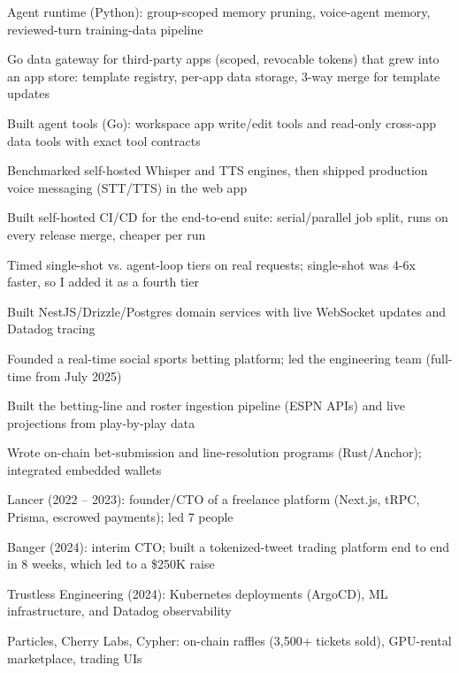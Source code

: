 \documentclass[print]{jack-resume}
\begin{document}
\begin{tightemize}
    \item Agent runtime (Python): group-scoped memory pruning, voice-agent memory, reviewed-turn training-data pipeline
    \item Go data gateway for third-party apps (scoped, revocable tokens) that grew into an app store: template registry, per-app data storage, 3-way merge for template updates
    \item Built agent tools (Go): workspace app write/edit tools and read-only cross-app data tools with exact tool contracts
    \item Benchmarked self-hosted Whisper and TTS engines, then shipped production voice messaging (STT/TTS) in the web app
    \item Built self-hosted CI/CD for the end-to-end suite: serial/parallel job split, runs on every release merge, cheaper per run
    \item Timed single-shot vs. agent-loop tiers on real requests; single-shot was 4-6x faster, so I added it as a fourth tier
\end{tightemize}
\sectionsep

\begin{tightemize}
    \item Built NestJS/Drizzle/Postgres domain services with live WebSocket updates and Datadog tracing
    \item Founded a real-time social sports betting platform; led the engineering team (full-time from July 2025)
    \item Built the betting-line and roster ingestion pipeline (ESPN APIs) and live projections from play-by-play data
    \item Wrote on-chain bet-submission and line-resolution programs (Rust/Anchor); integrated embedded wallets
\end{tightemize}
\sectionsep

\begin{tightemize}
    \item Lancer (2022 – 2023): founder/CTO of a freelance platform (Next.js, tRPC, Prisma, escrowed payments); led 7 people
    \item Banger (2024): interim CTO; built a tokenized-tweet trading platform end to end in 8 weeks, which led to a \$250K raise
    \item Trustless Engineering (2024): Kubernetes deployments (ArgoCD), ML infrastructure, and Datadog observability
    \item Particles, Cherry Labs, Cypher: on-chain raffles (3,500+ tickets sold), GPU-rental marketplace, trading UIs
\end{tightemize}
\sectionsep
\end{document}
